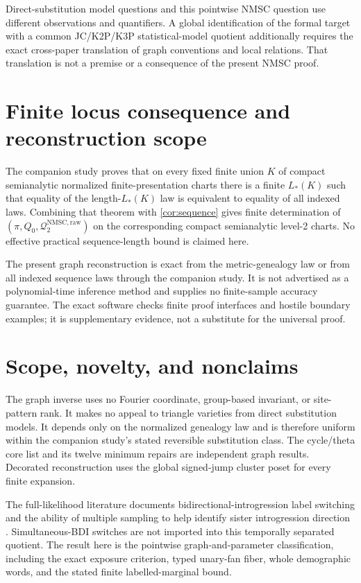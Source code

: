 \documentclass[11pt]{article}
\newcommand{\Qraw}{\mathcal Q^{\mathrm{NMSC,raw}}_2}
\begin{document}
Direct-substitution model questions and this pointwise NMSC question use
different observations and quantifiers.  A global identification of the
formal target with a common JC/K2P/K3P statistical-model quotient additionally
requires the exact cross-paper translation of graph conventions and local
relations.  That translation is not a premise or a consequence of the
present NMSC proof.

\section{Finite locus consequence and reconstruction scope}
The companion study \citep{KriebelNMSCCore2026} proves that on every fixed finite union $K$ of compact semianalytic normalized finite-presentation charts there is a finite $L_*(K)$ such that equality of the length-$L_*(K)$ law is equivalent to equality of all indexed laws.  Combining that theorem with \cref{cor:sequence} gives finite determination of $(\pi,Q_0,\Qraw)$ on the corresponding compact semianalytic level-2 charts.  No effective practical sequence-length bound is claimed here.

The present graph reconstruction is exact from the metric-genealogy law or from all indexed sequence laws through the companion study.  It is not advertised as a polynomial-time inference method and supplies no finite-sample accuracy guarantee.  The exact software checks finite proof interfaces and hostile boundary examples; it is supplementary evidence, not a substitute for the universal proof.

\section{Scope, novelty, and nonclaims}
The graph inverse uses no Fourier coordinate, group-based invariant, or
site-pattern rank.  It makes no appeal to triangle varieties from direct
substitution models.  It depends only on the normalized genealogy law and is
therefore uniform within the companion study's stated reversible substitution class.
The cycle/theta core list and its twelve minimum repairs are independent
graph results.  Decorated reconstruction uses the global signed-jump
cluster poset for every finite expansion.

The full-likelihood literature documents bidirectional-introgression label
switching and the ability of multiple sampling to help identify sister
introgression direction \citep{YangFlouri2022,ThawornwattanaEtAl2023}.
Simultaneous-BDI switches are not imported into this temporally separated
quotient.  The result here is the pointwise graph-and-parameter
classification, including the exact exposure criterion, typed unary-fan
fiber, whole demographic words, and the stated finite labelled-marginal
bound.
\end{document}
